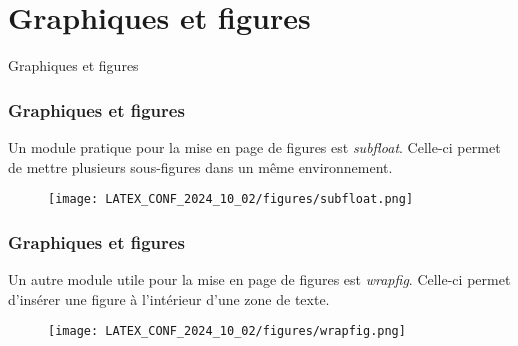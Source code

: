 
\section{Graphiques et figures}

\begin{frame}
    \vfill
    \begin{center}
        \large
        Graphiques et figures
    \end{center}
    \vfill
\end{frame}

\begin{frame}
    \frametitle{Graphiques et figures}
    Un module pratique pour la mise en page de figures est \textcolor{vibrant_green}{\textit{subfloat}}\footnotemark. Celle-ci permet de mettre plusieurs sous-figures dans un même environnement.
    \vfill
    \begin{figure}
        \centering
        \texttt{[image: LATEX\_CONF\_2024\_10\_02/figures/subfloat.png]}
        \label{fig: subfloat}
    \end{figure}
\end{frame}

\begin{frame}
    \frametitle{Graphiques et figures}
    Un autre module utile pour la mise en page de figures est \textcolor{vibrant_green}{\textit{wrapfig}}\footnotemark. Celle-ci permet d'insérer une figure à l'intérieur d'une zone de texte.
    \vfill
    \begin{figure}
        \centering
        \texttt{[image: LATEX\_CONF\_2024\_10\_02/figures/wrapfig.png]}
        \label{fig: wrapfig}
    \end{figure}
\end{frame}

